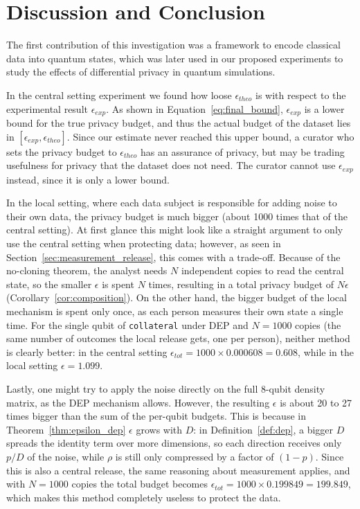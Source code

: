 \documentclass{ieeeaccess}
\begin{document}
\section{Discussion and Conclusion}
\label{sec:discussion_and_conclusion}


The first contribution of this investigation was a framework to encode classical data into quantum states, which was later used in our proposed experiments to study the effects of differential privacy in quantum simulations.

In the central setting experiment we found how loose $\epsilon_{theo}$ is with respect to the experimental result $\epsilon_{exp}$. As shown in Equation~\eqref{eq:final_bound}, $\epsilon_{exp}$ is a lower bound for the true privacy budget, and thus the actual budget of the dataset lies in $[\epsilon_{exp}, \epsilon_{theo}]$. Since our estimate never reached this upper bound, a curator who sets the privacy budget to $\epsilon_{theo}$ has an assurance of privacy, but may be trading usefulness for privacy that the dataset does not need. The curator cannot use $\epsilon_{exp}$ instead, since it is only a lower bound.

In the local setting, where each data subject is responsible for adding noise to their own data, the privacy budget is much bigger (about 1000 times that of the central setting). At first glance this might look like a straight argument to only use the central setting when protecting data; however, as seen in Section~\ref{sec:measurement_release}, this comes with a trade-off. Because of the no-cloning theorem, the analyst needs $N$ independent copies to read the central state, so the smaller $\epsilon$ is spent $N$ times, resulting in a total privacy budget of $N\epsilon$ (Corollary~\ref{cor:composition}). On the other hand, the bigger budget of the local mechanism is spent only once, as each person measures their own state a single time. For the single qubit of \texttt{collateral} under DEP and $N = 1000$ copies (the same number of outcomes the local release gets, one per person), neither method is clearly better: in the central setting $\epsilon_{tot} = 1000 \times 0.000608 = 0.608$, while in the local setting $\epsilon = 1.099$.

Lastly, one might try to apply the noise directly on the full 8-qubit density matrix, as the DEP mechanism allows. However, the resulting $\epsilon$ is about 20 to 27 times bigger than the sum of the per-qubit budgets. This is because in Theorem~\ref{thm:epsilon_dep} $\epsilon$ grows with $D$: in Definition~\ref{def:dep}, a bigger $D$ spreads the identity term over more dimensions, so each direction receives only $p/D$ of the noise, while $\rho$ is still only compressed by a factor of $(1-p)$. Since this is also a central release, the same reasoning about measurement applies, and with $N = 1000$ copies the total budget becomes $\epsilon_{tot} = 1000 \times 0.199849 = 199.849$, which makes this method completely useless to protect the data.
\end{document}
